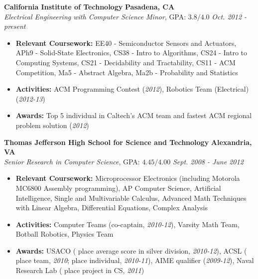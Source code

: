 \documentclass{article}
\newenvironment{changemargin}[2]{%
  \begin{list}{}{%
    \setlength{\topsep}{0pt}%
    \setlength{\leftmargin}{#1}%
    \setlength{\rightmargin}{#2}%
    \setlength{\listparindent}{\parindent}%
    \setlength{\itemindent}{\parindent}%
    \setlength{\parsep}{\parskip}%
  }%
  \item[]}{\end{list}
}
\newenvironment{body} {
	\vspace*{-16pt}
	\begin{changemargin}{-0.25in}{-0.5in}
  }	
	{\end{changemargin}
}
\begin{document}
\begin{body}
	\vspace{14pt}
	\textbf{California Institute of Technology} \hfill \textbf{Pasadena, CA}{} \\
	\emph{Electrical Engineering with Computer Science Minor}, GPA: $3.8/4.0$ \hfill \emph{Oct. 2012 - present} \\
	\begin{itemize}%
	\item \textbf{Relevant Coursework:} EE40 - Semiconductor Sensors and Actuators, APh9 - Solid-State Electronics, CS38 - Intro to Algorithms, CS24 - Intro to Computing Systems, CS21 - Decidability and Tractability, CS11 - ACM Competition, Ma5 - Abstract Algebra, Ma2b - Probability and Statistics
	\item \textbf{Activities:} ACM Programming Contest (\textit{2012}), Robotics Team (Electrical) (\textit{2012-13})
	\item \textbf{Awards:} Top 5 individual in Caltech's ACM team and fastest ACM regional problem solution (\textit{2012})
	\end{itemize}

	\medskip

	\textbf{Thomas Jefferson High School for Science and Technology} \hfill \textbf{Alexandria, VA} \\
	\emph{Senior Research in Computer Science}, GPA: $4.45/4.00$ \hfill \emph{Sept. 2008 - June 2012} \\
	\begin{itemize}%
	\item \textbf{Relevant Coursework:} Microprocessor Electronics (including Motorola MC6800 Assembly programming), AP Computer Science, Artificial Intelligence, Single and Multivariable Calculus, Advanced Math Techniques with Linear Algebra, Differential Equations, Complex Analysis
	\item \textbf{Activities:} Computer Teams (co-captain, \textit{2010-12}), Varsity Math Team, Botball Robotics, Physics Team
	\item \textbf{Awards:} USACO ( place average score in silver division, \textit{2010-12}), ACSL ( place team, \textit{2010};  place individual, \textit{2010-11}), AIME qualifier (\textit{2009-12}), Naval Research Lab ( place project in CS, \textit{2011})
	\end{itemize}
\end{body}
\end{document}
